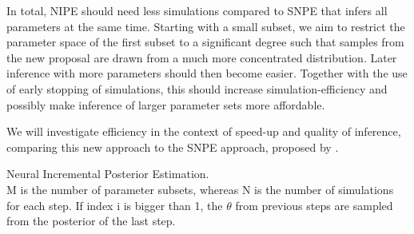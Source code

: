 \documentclass[12pt]{extreport}
\begin{document}
In total, NIPE should need less simulations compared to SNPE \citep{greenberg_automatic_2019} that infers all parameters at the same time. Starting with a small subset, we aim to restrict the parameter space of the first subset to a significant degree such that samples from the new proposal are drawn from a much more concentrated distribution. Later inference with more parameters should then become easier. Together with the use of early stopping of simulations, this should increase simulation-efficiency and possibly make inference of larger parameter sets more affordable.

We will investigate efficiency in the context of speed-up and quality of inference, comparing this new approach to the SNPE approach, proposed by \cite{greenberg_automatic_2019}.\\



\begin{algorithm}[H]

	
	\caption{Neural Incremental Posterior Estimation.\\ \small M is the number of parameter subsets, whereas N is the number of simulations for each step. If index i is bigger than 1, the $\theta$ from previous steps are sampled from the posterior of the last step. }
	
\end{algorithm}
\end{document}
